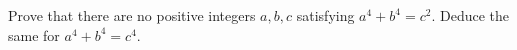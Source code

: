 Prove that there are no positive integers $ a,b,c $ satisfying $ a^4+b^4=c^2 $. Deduce the same for $ a^4+b^4=c^4 $.
